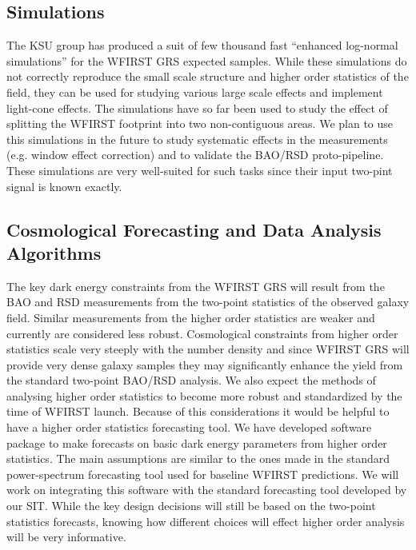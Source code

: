  \subsection{Simulations}

 The KSU group has produced a suit of few thousand fast ``enhanced log-normal
 simulations'' for the WFIRST GRS expected samples. While these simulations do
 not correctly reproduce the small scale structure and higher order statistics of
 the field, they can be used for studying various large scale effects and
 implement light-cone effects. The simulations have so far been used to study the
 effect of splitting the WFIRST footprint into two non-contiguous areas. We plan
 to use this simulations in the future to study systematic effects in the
 measurements (e.g. window effect correction) and to validate the BAO/RSD
 proto-pipeline. These simulations are very well-suited for such tasks since
 their input two-pint signal is known exactly.

 \subsection{Cosmological Forecasting and Data Analysis Algorithms}

 The key dark energy constraints from the WFIRST GRS will result from the BAO and
 RSD measurements from the two-point statistics of the observed galaxy field.
 Similar measurements from the higher order statistics are weaker and currently
 are considered less robust. Cosmological constraints from higher order
 statistics scale very steeply with the number density and since WFIRST GRS will
 provide very dense galaxy samples they may significantly enhance the yield from
 the standard two-point BAO/RSD analysis. We also expect the methods of analysing
 higher order statistics to become more robust and standardized by the time of
 WFIRST launch. Because of this considerations it would be helpful to have a
 higher order statistics forecasting tool. We have developed software package to
 make forecasts on basic dark energy parameters from higher order statistics.
 The main assumptions are similar to the ones made in the standard
 power-spectrum forecasting tool used for baseline WFIRST predictions. We will
 work on integrating this software with the standard forecasting tool developed
 by our SIT. While the key design decisions will still be based on the
 two-point statistics forecasts, knowing how different choices will effect higher
 order analysis will be very informative.

